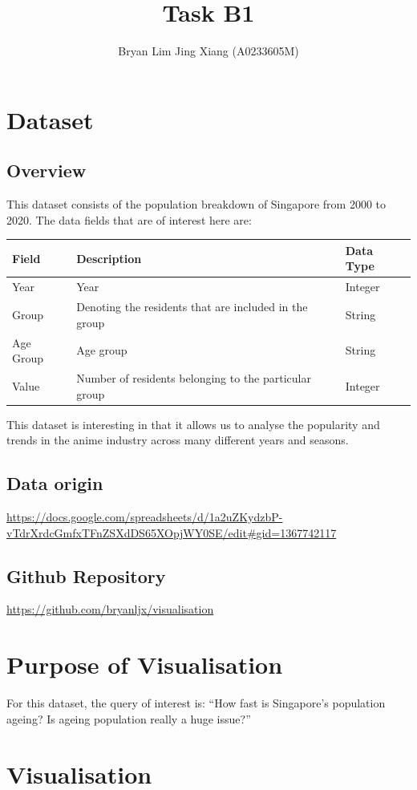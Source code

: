 \documentclass[a4paper, 11pt]{article}
\author{Bryan Lim Jing Xiang (A0233605M)}
\date{}
\title{Task B1}
\begin{document}
\maketitle
\section{Dataset}
\label{sec:org2dcf744}
\subsection{Overview}
\label{sec:org2f62eb1}
This dataset consists of the population breakdown of Singapore from 2000 to 2020. The data fields that are of interest here are:

\begin{center}
\begin{tabular}{lll}
Field & Description & Data Type\\[0pt]
\hline
Year & Year & Integer\\[0pt]
Group & Denoting the residents that are included in the group & String\\[0pt]
Age Group & Age group & String\\[0pt]
Value & Number of residents belonging to the particular group & Integer\\[0pt]
\end{tabular}
\end{center}

This dataset is interesting in that it allows us to analyse the popularity and trends in the anime industry across many different years and seasons.
\subsection{Data origin}
\label{sec:orga4296b2}
\url{https://docs.google.com/spreadsheets/d/1a2uZKydzbP-vTdrXrdcGmfxTFnZSXdDS65XOpjWY0SE/edit\#gid=1367742117}
\subsection{Github Repository}
\label{sec:org9233c79}
\url{https://github.com/bryanljx/visualisation}
\section{Purpose of Visualisation}
\label{sec:org4df4e70}
For this dataset, the query of interest is: ``How fast is Singapore's population ageing? Is ageing population really a huge issue?''
\section{Visualisation}
\label{sec:org07249ab}
\end{document}
